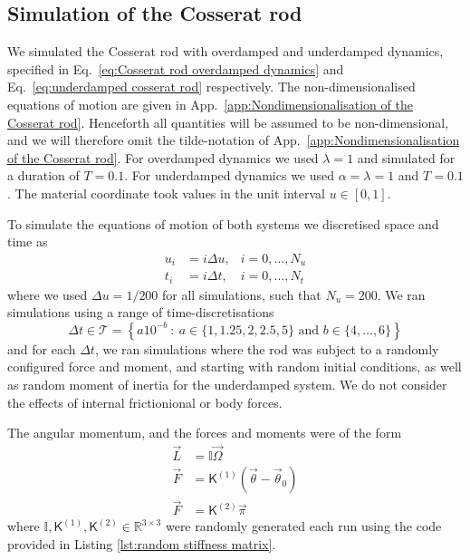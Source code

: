 \documentclass[withindex,glossary,techreport]{cam-thesis}
\begin{document}
\begin{appendices}
\section{Simulation of the Cosserat rod}

We simulated the Cosserat rod with overdamped and underdamped dynamics, specified in Eq.~\ref{eq:Cosserat rod overdamped dynamics} and Eq.~\ref{eq:underdamped cosserat rod} respectively. The non-dimensionalised equations of motion are given in App.~\ref{app:Nondimensionalisation of the Cosserat rod}. Henceforth all quantities will be assumed to be non-dimensional, and we will therefore omit the tilde-notation of App.~\ref{app:Nondimensionalisation of the Cosserat rod}. For overdamped dynamics we used $\lambda = 1$ and simulated for a duration of $T = 0.1$. For underdamped dynamics we used $\alpha = \lambda = 1$ and $T = 0.1$. The material coordinate took values in the unit interval $u \in [0,1]$.

To simulate the equations of motion of both systems we discretised space and time as
\begin{subequations}
	\begin{align} 
		u_i  & = i \Delta u, & i=0, \dots, N_u  \\
		t_i & = i \Delta t, & i=0, \dots, N_t
	\end{align}
\end{subequations}
where we used $\Delta u = 1/200$ for all simulations, such that $N_u = 200$. We ran simulations using a range of time-discretisations
\begin{equation} \label{eq:cosserat dts}
	\Delta t \in \mathcal{T} = \left\{ a 10^{-b}\ :\ a \in \{1, 1.25, 2, 2.5, 5 \} \text{ and } b \in \{ 4, \dots, 6 \} \right\}
\end{equation}
and for each $\Delta t$, we ran simulations where the rod was subject to a randomly configured force and moment, and starting with random initial conditions, as well as random moment of inertia for the underdamped system. We do not consider  the effects of internal frictionional or body forces.

The angular momentum, and the forces and moments were of the form
\begin{subequations}
	\begin{align}
		\vec{L} & = \mathbb{I} \vec{\Omega} \\
		\vec{F} & = \mathsf{K}^{(1)} (\vec{\theta} - \vec{\theta}_0) \\
		\vec{F} & = \mathsf{K}^{(2)} \vec{\pi}
	\end{align}
\end{subequations}
where $\mathbb{I}, \mathsf{K}^{(1)}, \mathsf{K}^{(2)} \in \mathbb{R}^{3 \times 3}$ were randomly generated each run using the code provided in Listing \ref{lst:random stiffness matrix}.


\end{appendices}
\end{document}
